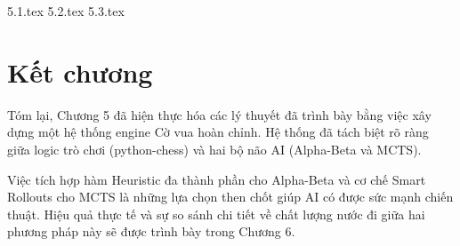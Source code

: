 {5.1.tex}
{5.2.tex}
{5.3.tex}

\section{Kết chương}
Tóm lại, Chương 5 đã hiện thực hóa các lý thuyết đã trình bày bằng việc xây dựng một hệ thống engine Cờ vua hoàn chỉnh. Hệ thống đã tách biệt rõ ràng giữa logic trò chơi (python-chess) và hai bộ não AI (Alpha-Beta và MCTS). 

Việc tích hợp hàm Heuristic đa thành phần cho Alpha-Beta và cơ chế Smart Rollouts cho MCTS là những lựa chọn then chốt giúp AI có được sức mạnh chiến thuật. Hiệu quả thực tế và sự so sánh chi tiết về chất lượng nước đi giữa hai phương pháp này sẽ được trình bày trong Chương 6.

